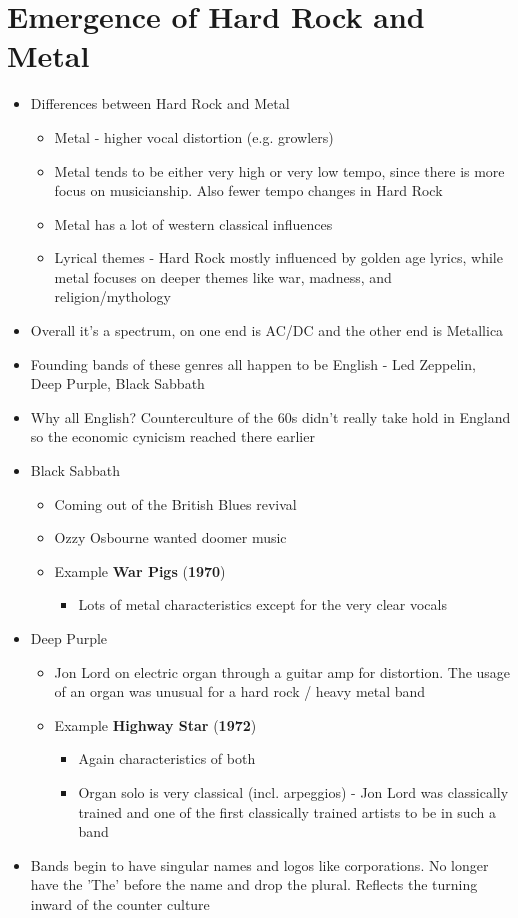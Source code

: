 \documentclass[11pt]{report}
\newcommand{\imp}[1]{\textbf{#1}}
\newcommand{\idate}[2]{\textcolor{blue!50}{\imp{#1}}\label{date:#2}}
\newcommand{\bl}{\begin{itemize}}
\newcommand{\kl}{\end{itemize}}
\newcommand{\song}[2]{\textcolor{red!70}{\textbf{#1}} (\idate{#2}{#1})}
\begin{document}
\section{Emergence of Hard Rock and Metal}
\begin{itemize}
	\item Differences between Hard Rock and Metal
	\bl
		\item Metal - higher vocal distortion (e.g. growlers)
		\item Metal tends to be either very high or very low tempo, since there is more focus on musicianship. Also fewer tempo changes in Hard Rock
		\item Metal has a lot of western classical influences
		\item Lyrical themes - Hard Rock mostly influenced by golden age lyrics, while metal focuses on deeper themes like war, madness, and religion/mythology
	\kl
	\item Overall it's a spectrum, on one end is AC/DC and the other end is Metallica
	\item Founding bands of these genres all happen to be English - Led Zeppelin, Deep Purple, Black Sabbath
	\item Why all English? Counterculture of the 60s didn't really take hold in England so the economic cynicism reached there earlier
	\item Black Sabbath
	\bl
		\item Coming out of the British Blues revival
		\item Ozzy Osbourne wanted doomer music
		\item Example \song{War Pigs}{1970}
		\bl
			\item Lots of metal characteristics except for the very clear vocals
		\kl
	\kl
	\item Deep Purple
	\bl
		\item Jon Lord on electric organ through a guitar amp for distortion. The usage of an organ was unusual for a hard rock / heavy metal band
		\item Example \song{Highway Star}{1972}
		\bl
			\item Again characteristics of both
			\item Organ solo is very classical (incl. arpeggios) - Jon Lord was classically trained and one of the first classically trained artists to be in such a band
		\kl
	\kl
	\item Bands begin to have singular names and logos like corporations. No longer have the 'The' before the name and drop the plural. Reflects the turning inward of the counter culture


\end{itemize}
\end{document}
